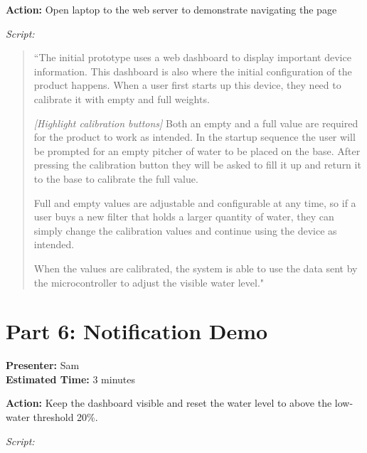 \documentclass[12pt]{article}
\begin{document}
\noindent\textbf{Action:} Open laptop to the web server to demonstrate navigating the page

\bigskip
\noindent\textit{Script:}

\begin{quote}
``The initial prototype uses a web dashboard to display important device information. This dashboard is also where the initial configuration of the product happens. When a user first starts up this device, they need to calibrate it with empty and full weights. 

\textit{[Highlight calibration buttons]} Both an empty and a full value are required for the product to work as intended. In the startup sequence the user will be prompted for an empty pitcher of water to be placed on the base. After pressing the calibration button they will be asked to fill it up and return it to the base to calibrate the full value. 

Full and empty values are adjustable and configurable at any time, so if a user buys a new filter that holds a larger quantity of water, they can simply change the calibration values and continue using the device as intended. 

When the values are calibrated, the system is able to use the data sent by the microcontroller to adjust the visible water level."
\end{quote}

\section*{Part 6: Notification Demo}
\noindent\textbf{Presenter:} Sam\\  
\noindent\textbf{Estimated Time:} 3 minutes

\noindent\textbf{Action:} Keep the dashboard visible and reset the water level to above the low-water threshold 20\%.

\bigskip
\noindent\textit{Script:}
\end{document}
